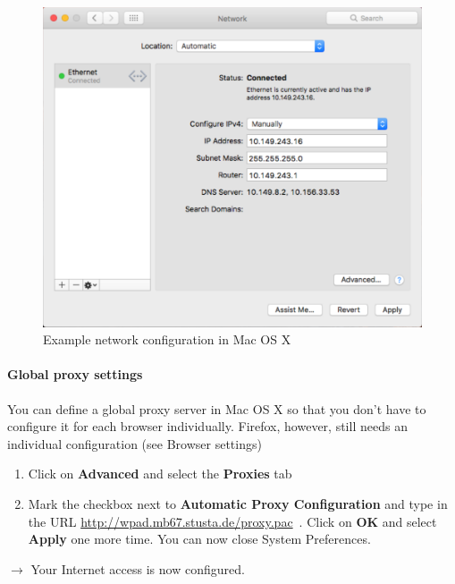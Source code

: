 \documentclass[a4paper,12pt]{scrartcl}
\newcommand{\optemph}[1]{\textbf{#1}}
\begin{document}
\begin{enumerate}
\begin{figure}[h!]
\begin{minipage}[c]{0.38\linewidth}
        \end{minipage}
        \begin{minipage}[c]{0.60\linewidth}
          \centering
          \includegraphics[width=\linewidth,keepaspectratio]{Bilder/IP_Mac_EN_mb}
          \caption{Example network configuration in Mac OS X}
        \end{minipage}
      \end{figure}
\end{enumerate}

\paragraph*{Global proxy settings}
You can define a global proxy server in Mac OS X so that you don't have to configure it for each browser individually. Firefox, however, still needs an individual configuration (see Browser settings)
\begin{enumerate}
	\item Click on \optemph{Advanced} and select the \optemph{Proxies} tab
	\item Mark the checkbox next to \optemph{Automatic Proxy Configuration} and type in the URL \url{http://wpad.mb67.stusta.de/proxy.pac}\ . Click on \optemph{OK} and select \optemph{Apply} one more time. You can now close System Preferences.
\end{enumerate}
$\rightarrow$ Your Internet access is now configured.
\end{document}

